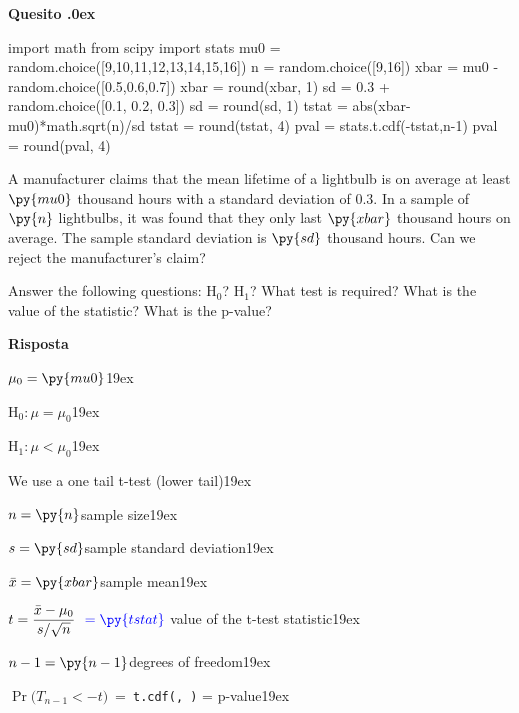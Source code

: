 \documentclass[11pt,twoside,a4paper]{article}
\newcounter{quesito}
\newenvironment{question}{\bigskip\addtocounter{quesito}{1}\bigskip\bigskip\par\textbf{Quesito \thequesito.\kern0ex}}{\par\vspace{\parskip}}
\newenvironment{answer}{\par\textbf{Risposta\quad}}{\par\vspace{\parskip}}
\begin{document}
\clearpage
\begin{question}
\begin{pycode}
import math
from scipy import stats
mu0 = random.choice([9,10,11,12,13,14,15,16])
n = random.choice([9,16])
xbar = mu0 - random.choice([0.5,0.6,0.7])
xbar = round(xbar, 1)
sd = 0.3 + random.choice([0.1, 0.2, 0.3])
sd = round(sd, 1)
tstat = abs(xbar-mu0)*math.sqrt(n)/sd
tstat = round(tstat, 4)
pval = stats.t.cdf(-tstat,n-1)
pval = round(pval, 4)
\end{pycode}
A manufacturer claims that the mean lifetime of a lightbulb is on average at least $\py{mu0}$ thousand  hours with a standard deviation of $0.3$. In a sample of $\py{n}$ lightbulbs, it was found that they only last $\py{xbar}$ thousand hours on average. The sample standard deviation is $\py{sd}$ thousand hours. Can we reject the manufacturer's claim? 

Answer the following questions: H$_0$? H$_1$? What test is required? What is the value of the statistic? What is the p-value? 

\begin{answer}\parskip5pt

  $\mu_0 = \py{mu0}$\kern19ex

  {\color{blue}H$_0:$\hfill $\mu = \mu_0$}\kern19ex
  
  {\color{blue}H$_1:$\hfill $\mu<\mu_0$}\kern19ex
  
  We use a one tail t-test (lower tail)\kern19ex
  
  $n = \py{n}$\hfill sample size\kern19ex
  
  $s = \py{sd}$\hfill sample standard deviation\kern19ex
  
  $\bar{x} = \py{xbar}$\hfill sample mean\kern19ex
  
  $t = \displaystyle\frac{\bar{x}-\mu_0}{s/\sqrt{n}}\  {\color{blue}\ = \py{tstat}}$\hfill{\color{blue} value of the t-test statistic}\kern19ex
  
  $n-1 = \py{n-1}$\hfill degrees of freedom\kern19ex
  
  $\Pr\big(T_{n-1}<-t\big)\  =\ ${\color{blue}\tt t.cdf(,\ )} = \hfill{\color{blue} p-value}\kern19ex

\end{answer}
\end{question}
\end{document}
